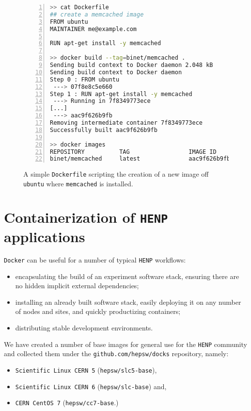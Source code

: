 \documentclass[a4paper]{jpconf}
\begin{document}
\begin{figure}[h]
	\begin{lstlisting}[language=sh,
		basicstyle=\tiny,
		frame=trbl,
		numbers=left,
		showstringspaces=false,
	stringstyle=\ttfamily]
>> cat Dockerfile
## create a memcached image
FROM ubuntu
MAINTAINER me@example.com

RUN apt-get install -y memcached

>> docker build --tag=binet/memcached .
Sending build context to Docker daemon 2.048 kB
Sending build context to Docker daemon 
Step 0 : FROM ubuntu
 ---> 07f8e8c5e660
Step 1 : RUN apt-get install -y memcached
 ---> Running in 7f8349773ece
[...]
 ---> aac9f626b9fb
Removing intermediate container 7f8349773ece
Successfully built aac9f626b9fb

>> docker images
REPOSITORY          TAG                 IMAGE ID            CREATED              VIRTUAL SIZE
binet/memcached     latest              aac9f626b9fb        About a minute ago   190 MB
\end{lstlisting}
\caption{\label{fig-docker-dockerfile-create}A simple \texttt{Dockerfile}
scripting the creation of a new image off \texttt{ubuntu} where
\texttt{memcached} is installed.}
\end{figure}


\section{Containerization of \texttt{HENP} applications}

\texttt{Docker} can be useful for a number of typical \texttt{HENP} workflows:
\begin{itemize}
	\item encapsulating the build of an experiment software stack, ensuring
		there are no hidden implicit external dependencies;
	\item installing an already built software stack, easily deploying
		it on any number of nodes and sites, and quickly productizing
		containers;
	\item distributing stable development environments.
\end{itemize}

We have created a number of base images for general use for the \texttt{HENP}
community and collected them under the \texttt{github.com/hepsw/docks}
repository, namely:
\begin{itemize}
	\item \texttt{Scientific Linux CERN 5} (\texttt{hepsw/slc5-base}),
	\item \texttt{Scientific Linux CERN 6} (\texttt{hepsw/slc-base}) and,
	\item \texttt{CERN CentOS 7} (\texttt{hepsw/cc7-base}.)
\end{itemize}
\end{document}

